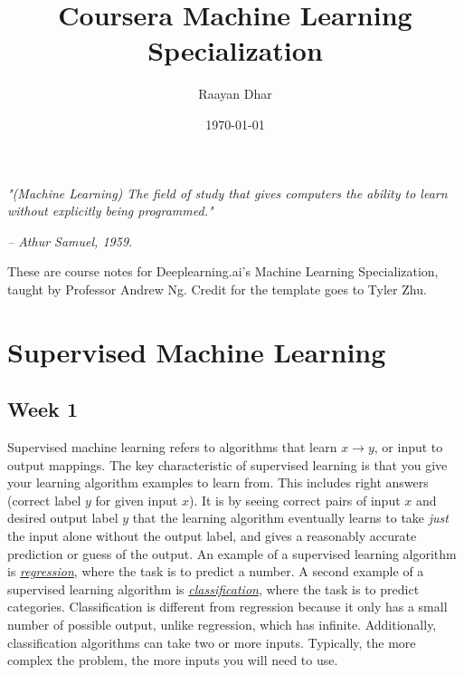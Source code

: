 \documentclass[11 pt]{scrartcl}
\begin{document}
 
\title{\Large Coursera Machine Learning Specialization}
\author{\large Raayan Dhar}
\date{\large\today}

\maketitle 

\begin{center}
\begin{displayquote}
    \emph{"(Machine Learning) The field of study that gives computers the ability to learn without explicitly being programmed."} \\ \begin{flushright} \emph{– Athur Samuel, 1959}.  \end{flushright}
\end{displayquote}
\end{center}


These are course notes for Deeplearning.ai's Machine Learning Specialization, taught by Professor Andrew Ng. Credit for the template goes to Tyler Zhu.

\tableofcontents 

\newpage

\section{Supervised Machine Learning}

\subsection{Week 1}
Supervised machine learning refers to algorithms that learn $x \rightarrow y$, or input to output mappings.
\newline\newline The key characteristic of supervised learning is that you give your learning algorithm examples to learn from. This includes
right answers (correct label $y$ for given input $x$). It is by seeing correct pairs of input $x$ and desired output label $y$
that the learning algorithm eventually learns to take \textit{just} the input alone without the output label, and gives a reasonably
accurate prediction or guess of the output. An example of a supervised learning algorithm is \textit{\underline{regression}}, where the task is to predict
a number. A second example of a supervised learning algorithm is \textit{\underline{classification}}, where the task is to predict
categories. Classification is different from regression because it only has a small number of possible output, unlike regression, which has infinite.
Additionally, classification algorithms can take two or more inputs. Typically, the more complex the problem, the more
inputs you will need to use. 
\end{document}
